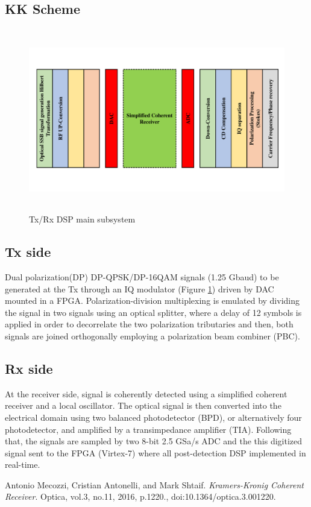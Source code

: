 \subsection{KK Scheme}


\begin{figure}[h]
	\centering
	\includegraphics[width=1.0\textwidth, height=8cm]{./sdf/simplified_coherent_receiver/figures/detailed_subsystem.pdf}
	\caption{Tx/Rx DSP main subsystem}\label{DSP_main_subsystem}
\end{figure}

\subsection{Tx side}
Dual polarization(DP) DP-QPSK/DP-16QAM signals (1.25 Gbaud) to be generated at the Tx through an IQ modulator (Figure \ref{DSP_main_subsystem}) driven by DAC mounted in a FPGA. Polarization-division multiplexing is emulated by dividing the signal in two signals using an optical splitter, where a delay of 12 symbols is applied in order to decorrelate the two polarization tributaries and then, both signals are joined orthogonally employing a polarization beam combiner (PBC).

\subsection{Rx side}
At the receiver side, signal is coherently detected using a simplified coherent receiver and a local oscillator. The optical signal is then converted into the electrical domain using two balanced photodetector (BPD), or alternatively four photodetector, and amplified by a transimpedance amplifier (TIA). Following that, the signals are sampled by two 8-bit 2.5 GSa/s ADC and the this digitized signal sent to the FPGA (Virtex-7) where all post-detection DSP implemented in real-time.

\begin{thebibliography}{9}
	Antonio Mecozzi, Cristian Antonelli, and Mark Shtaif. 
	\textit{Kramers-Kronig Coherent Receiver}. 
	Optica, vol.3, no.11, 2016, p.1220., doi:10.1364/optica.3.001220.
	
\end{thebibliography}


